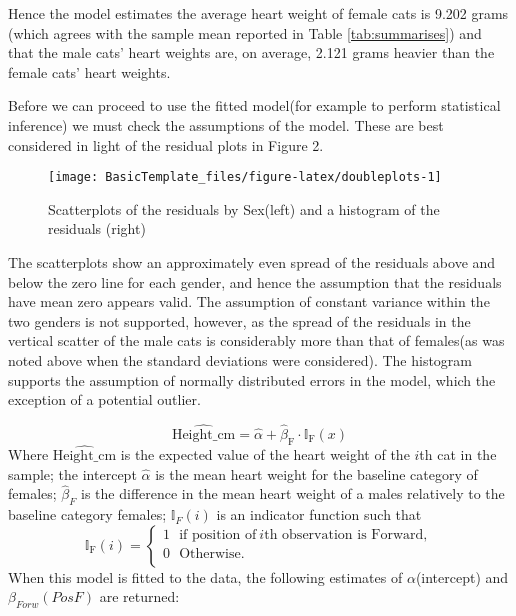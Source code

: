 \documentclass[
]{article}
\begin{document}
Hence the model estimates the average heart weight of female cats is
9.202 grams (which agrees with the sample mean reported in Table
\ref{tab:summarises}) and that the male cats' heart weights are, on
average, 2.121 grams heavier than the female cats' heart weights.

Before we can proceed to use the fitted model(for example to perform
statistical inference) we must check the assumptions of the model. These
are best considered in light of the residual plots in Figure 2.

\begin{figure}[H]

{\centering \texttt{[image: BasicTemplate\_files/figure-latex/doubleplots-1]} 

}

\caption{\label{fig:resids} Scatterplots of the residuals by Sex(left) and a histogram of the residuals (right)}\label{fig:doubleplots}
\end{figure}

The scatterplots show an approximately even spread of the residuals
above and below the zero line for each gender, and hence the assumption
that the residuals have mean zero appears valid. The assumption of
constant variance within the two genders is not supported, however, as
the spread of the residuals in the vertical scatter of the male cats is
considerably more than that of females(as was noted above when the
standard deviations were considered). The histogram supports the
assumption of normally distributed errors in the model, which the
exception of a potential outlier.

\[\widehat{\mbox{Height_cm}} = \widehat{\alpha} + \widehat{\beta}_{\mbox{F}} \cdot \mathbb{I}_{\mbox{F}}(x)\]
Where \(\widehat{\mbox{Height_cm}}\) is the expected value of the heart
weight of the \(i\)th cat in the sample; the intercept
\(\widehat{\alpha}\) is the mean heart weight for the baseline category
of females; \(\widehat{\beta}_{F}\) is the difference in the mean heart
weight of a males relatively to the baseline category females;
\(\mathbb{I}_{F}(i)\) is an indicator function such that
\[\mathbb{I}_{\mbox{F}}(i)=\left\{
  \begin{array}{ll}
  1 ~~~ \mbox{if position of} ~ i \mbox{th observation is Forward},\\
  0 ~~~ \mbox{Otherwise}.\\
  \end{array}
  \right.\] When this model is fitted to the data, the following
estimates of \(\alpha\)(intercept) and \(\beta_{Forw}(PosF)\) are
returned:
\end{document}
